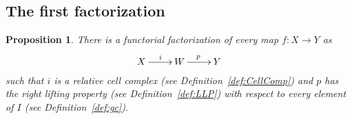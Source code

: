 \documentclass{amsart}
\numberwithin{equation}{section}
\theoremstyle{slplain}
\newtheorem{prop}[equation]{Proposition}
\theoremstyle{definition}
\theoremstyle{remark}
\newcommand{\defref}{Definition~\ref}
\begin{document}
\subsection{The first factorization}
\label{sec:FactFirst}

\begin{prop}
  \label{prop:CofFact}
  There is a functorial factorization of every map $f\colon X \to Y$
  as
  \begin{displaymath}
    \xymatrix{
      {X} \ar[r]^{i}
      & {W} \ar[r]^{p}
      & {Y}
    }
  \end{displaymath}
  such that $i$ is a relative cell complex (see \defref{def:CellComp})
  and $p$ has the right lifting property (see \defref{def:LLP}) with
  respect to every element of $I$ (see \defref{def:gc}).
\end{prop}
\end{document}

